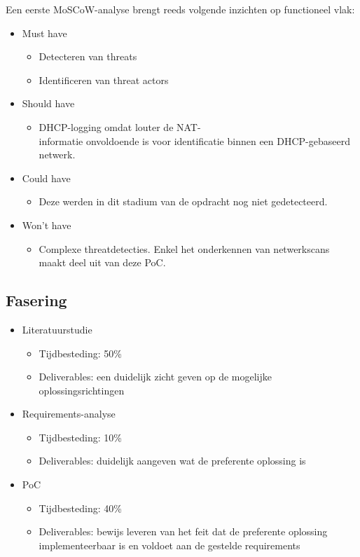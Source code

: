 Een eerste MoSCoW-analyse brengt reeds volgende inzichten op functioneel vlak:
\begin{itemize}
    \item Must have
        \begin{itemize}
            \item Detecteren van threats
            \item Identificeren van threat actors
        \end{itemize}
    \item Should have
        \begin{itemize}
            \item DHCP-logging omdat louter de NAT-\\informatie onvoldoende is voor identificatie binnen een DHCP-gebaseerd netwerk.
        \end{itemize}
    \item Could have
        \begin{itemize}
            \item Deze werden in dit stadium van de opdracht nog niet gedetecteerd.
        \end{itemize}
    \item Won't have
        \begin{itemize}
            \item  Complexe threatdetecties. Enkel het onderkennen van netwerkscans maakt deel uit van deze PoC.
        \end{itemize}
\end{itemize}

\subsection{Fasering}

\begin{itemize}
    \item Literatuurstudie
        \begin{itemize}
            \item Tijdbesteding: 50\%
            \item Deliverables: een duidelijk zicht geven op de mogelijke oplossingsrichtingen
        \end{itemize}
    \item Requirements-analyse
        \begin{itemize}
            \item Tijdbesteding: 10\%
            \item Deliverables: duidelijk aangeven wat  de preferente oplossing is
        \end{itemize}
    \item PoC
        \begin{itemize}
            \item Tijdbesteding: 40\%
            \item Deliverables: bewijs leveren van het feit dat de preferente oplossing implementeerbaar is en voldoet aan de gestelde requirements
        \end{itemize}
\end{itemize}

